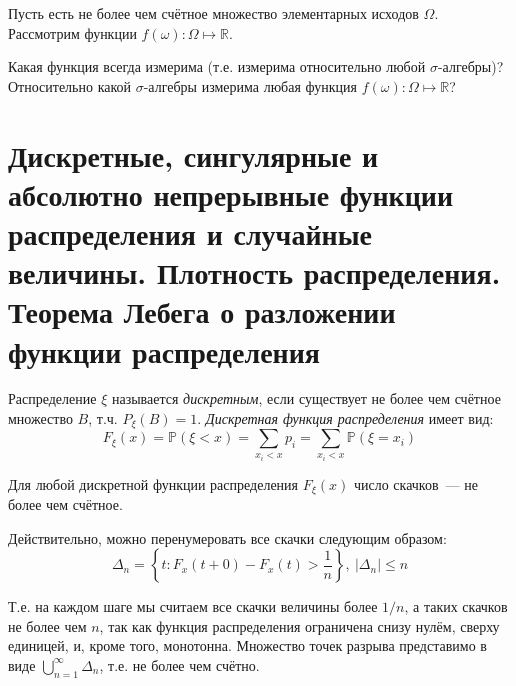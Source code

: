 \begin{task}
Пусть есть не более чем счётное множество элементарных исходов $\Omega$. Рассмотрим функции ${f(\omega) \colon \Omega \mapsto \mathbb{R}}$.

Какая функция всегда измерима (т.е. измерима относительно любой ${\sigma \text{-алгебры}}$)? 
Относительно какой ${\sigma \text{-алгебры}}$ измерима любая функция ${f(\omega) \colon \Omega \mapsto \mathbb{R}}$?
\end{task}
 
\section{Дискретные, сингулярные и абсолютно непрерывные функции распределения и случайные величины. Плотность распределения. Теорема Лебега о разложении функции распределения}

\begin{defn}
    Распределение $\xi$ называется {\it дискретным}, если существует не более чем счётное множество $B$, т.ч. $P_\xi(B) = 1$. \textit{Дискретная функция распределения} имеет вид:
    \begin{equation*}
        F_\xi(x) = \mathbb{P}(\xi < x) = \sum\limits_{x_i < x}{}p_{i} = \sum\limits_{x_i < x}{}\mathbb{P}(\xi = x_{i})
    \end{equation*}
\end{defn}

\begin{rmrk}
    Для любой дискретной функции распределения $F_\xi(x)$ число скачков~--- не более чем счётное.
    
    Действительно, можно перенумеровать все скачки следующим образом:
    \begin{equation*}
        \Delta_{n}=\left\{t \colon F_{x}(t+0)-F_{x}(t)>\frac{1}{n}\right\},~ |\Delta_{n} | \leqslant n
    \end{equation*}
    
    Т.е. на каждом шаге мы считаем все скачки величины более $1 / n$, а таких скачков не более чем $n$, так как функция распределения ограничена снизу нулём, сверху единицей, и, кроме того, монотонна.
    Множество точек разрыва представимо в виде $\bigcup\limits_{n = 1}^{\infty} \Delta_{n}$, т.е. не более чем счётно.
\end{rmrk}

